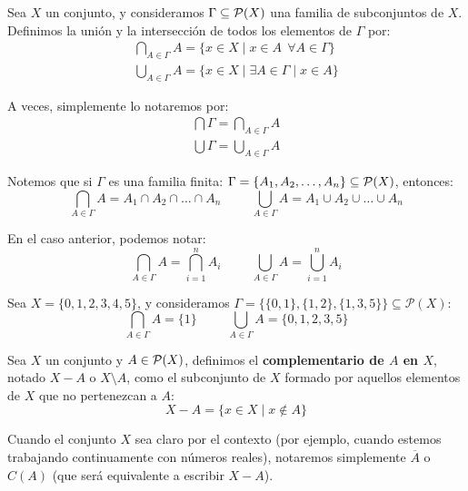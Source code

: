 \begin{definicion}
    Sea $X$ un conjunto, y consideramos $\Gamma \subseteq \mathcal{P}(X)$ una familia de subconjuntos de $X$. Definimos la unión y la intersección de todos los elementos de $\Gamma$ por:
    \begin{gather*}
        \bigcap_{A \in \Gamma} A = \{x \in X \mid x \in A~~\forall A \in \Gamma \}\\
        \bigcup_{A \in \Gamma} A = \{x \in X \mid \exists A \in \Gamma \mid x \in A \}
    \end{gather*}

    A veces, simplemente lo notaremos por:
    \begin{gather*}
        \bigcap \Gamma = \bigcap_{A\in \Gamma}A \\
        \bigcup \Gamma = \bigcup_{A\in \Gamma}A
    \end{gather*}

    Notemos que si $\Gamma$ es una familia finita: $\Gamma = \{A_1, A_2, \ldots, A_n\} \subseteq \mathcal{P}(X)$, entonces:
    \begin{equation*}
        \bigcap_{A \in \Gamma}A = A_1 \cap A_2 \cap \ldots \cap A_n
        \hspace{1cm}
        \bigcup_{A \in \Gamma}A = A_1 \cup A_2 \cup \ldots \cup A_n
    \end{equation*}
    
    En el caso anterior, podemos notar:
    \begin{equation*}
        \bigcap_{A \in \Gamma}A = \bigcap_{i=1}^n A_i
        \hspace{1cm}
        \bigcup_{A \in \Gamma}A = \bigcup_{i=1}^n A_i
    \end{equation*}
\end{definicion}

\begin{ejemplo}
Sea $X = \{0, 1, 2, 3, 4, 5\}$, y consideramos ${\Gamma = \{\{0, 1\}, \{1, 2\}, \{1, 3, 5\}\}\subseteq \mathcal{P}(X)}$:
    \begin{equation*}
        \bigcap_{A \in \Gamma}A = \{1\}
        \hspace{1cm}
        \bigcup_{A \in \Gamma}A = \{0, 1, 2, 3, 5\}
    \end{equation*}
\end{ejemplo}

\begin{definicion}[Complementario]
    Sea $X$ un conjunto y $A \in \mathcal{P}(X)$, definimos el \textbf{complementario de $A$ en $X$}, notado $X-A$ o $X\setminus A$, como el subconjunto de $X$ formado por aquellos elementos de $X$ que no pertenezcan a $A$:
    $$X-A = \{x \in X \mid x \notin A\}$$
\end{definicion}
\begin{notacion}
    Cuando el conjunto $X$ sea claro por el contexto (por ejemplo, cuando estemos trabajando continuamente con números reales), notaremos simplemente $\overline{A}$ o $C(A)$ (que será equivalente a escribir $X-A$).
\end{notacion}

